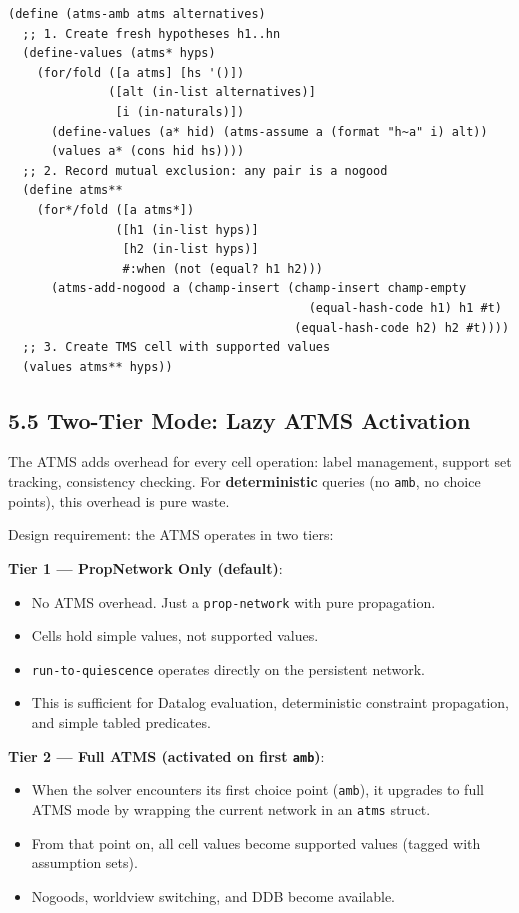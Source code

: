 \documentclass[11pt]{article}
\begin{document}
\begin{verbatim}
(define (atms-amb atms alternatives)
  ;; 1. Create fresh hypotheses h1..hn
  (define-values (atms* hyps)
    (for/fold ([a atms] [hs '()])
              ([alt (in-list alternatives)]
               [i (in-naturals)])
      (define-values (a* hid) (atms-assume a (format "h~a" i) alt))
      (values a* (cons hid hs))))
  ;; 2. Record mutual exclusion: any pair is a nogood
  (define atms**
    (for*/fold ([a atms*])
               ([h1 (in-list hyps)]
                [h2 (in-list hyps)]
                #:when (not (equal? h1 h2)))
      (atms-add-nogood a (champ-insert (champ-insert champ-empty
                                          (equal-hash-code h1) h1 #t)
                                        (equal-hash-code h2) h2 #t))))
  ;; 3. Create TMS cell with supported values
  (values atms** hyps))
\end{verbatim}
\subsection{5.5 Two-Tier Mode: Lazy ATMS Activation}
\label{sec:org4d07e4d}

The ATMS adds overhead for every cell operation: label management, support
set tracking, consistency checking. For \textbf{deterministic} queries (no \texttt{amb},
no choice points), this overhead is pure waste.

Design requirement: the ATMS operates in two tiers:

\textbf{Tier 1 — PropNetwork Only (default)}:
\begin{itemize}
\item No ATMS overhead. Just a \texttt{prop-network} with pure propagation.
\item Cells hold simple values, not supported values.
\item \texttt{run-to-quiescence} operates directly on the persistent network.
\item This is sufficient for Datalog evaluation, deterministic constraint
propagation, and simple tabled predicates.
\end{itemize}

\textbf{Tier 2 — Full ATMS (activated on first \texttt{amb})}:
\begin{itemize}
\item When the solver encounters its first choice point (\texttt{amb}), it upgrades
to full ATMS mode by wrapping the current network in an \texttt{atms} struct.
\item From that point on, all cell values become supported values (tagged with
assumption sets).
\item Nogoods, worldview switching, and DDB become available.
\end{itemize}
\end{document}
